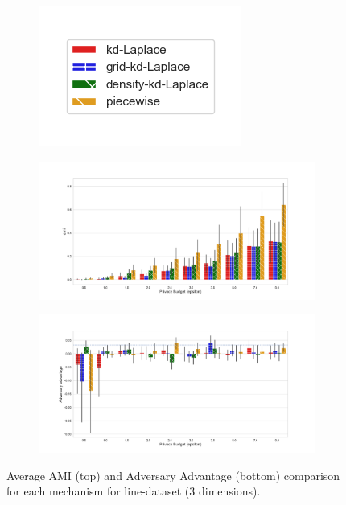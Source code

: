 \begin{figure}[H]
  \centering
  \begin{subfigure}{0.30\textwidth}
    \includegraphics[width=\textwidth]{Results/kd-laplace/ami_bar_comparison_legend.png}
  \end{subfigure}
  \begin{subfigure}{1\textwidth}
    \includegraphics[width=1\textwidth]{Results/nd-laplace/ami_line-dataset_comparison.png}
  \end{subfigure}
  \begin{subfigure}{1\textwidth}
    \includegraphics[width=1\textwidth]{Results/nd-laplace/attack_adv_line-dataset_comparison.png}
  \end{subfigure}
  \caption{Average AMI (top) and Adversary Advantage (bottom) comparison for each mechanism for line-dataset (3 dimensions).}
  \label{fig:utility_line-dataset_comparison_nd_plot}
\end{figure}
